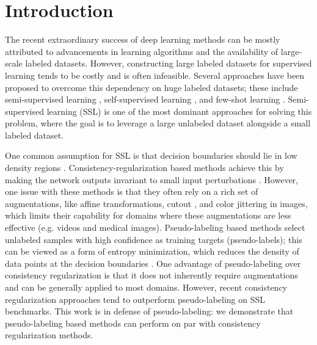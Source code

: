 \documentclass{article} \usepackage{iclr2021_conference,times}
\begin{document}
\section{Introduction}
The recent extraordinary success of deep learning methods can be mostly attributed to advancements in learning algorithms and the availability of large-scale labeled datasets. However, constructing large labeled datasets for supervised learning tends to be costly and is often infeasible. Several approaches have been proposed to overcome this dependency on huge labeled datasets; these include semi-supervised learning \citep{NIPS2019_8749_MixMatch,NIPS2017_6719_meanT, Miyato2018VirtualAT, Lee2013PseudoLabelT}, self-supervised learning \citep{doersch2015unsupervised, noroozi2016unsupervised, chen2020simple}, and few-shot learning \citep{finn2017model, snell2017prototypical, vinyals2016matching}. Semi-supervised learning (SSL) is one of the most dominant approaches for solving this problem, where the goal is to leverage a large unlabeled dataset alongside a small labeled dataset.







One common assumption for SSL is that decision boundaries should lie in low density regions \citep{chapelle2005semi}.
Consistency-regularization based methods achieve this by making the network outputs invariant to small input perturbations \citep{Verma2019InterpolationCT}. However, one issue with these methods is that they often rely on a rich set of augmentations, like affine transformations, cutout \citep{devries2017cutout}, and color jittering in images, which limits their capability for domains where these augmentations are less effective (e.g. videos and medical images). Pseudo-labeling based methods select unlabeled samples with high confidence as training targets (pseudo-labels); this can be viewed as a form of entropy minimization, which reduces the density of data points at the decision boundaries \citep{grandvalet2005semi, Lee2013PseudoLabelT}. One advantage
of pseudo-labeling over consistency regularization is that it does not inherently require augmentations and can be generally applied to most domains. However, recent consistency regularization approaches tend to outperform pseudo-labeling on SSL benchmarks. This work is in defense of pseudo-labeling: we demonstrate that pseudo-labeling based methods can perform on par with consistency regularization methods.
\end{document}
